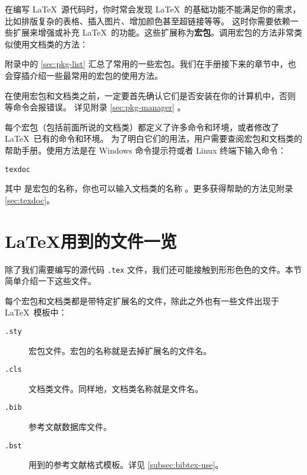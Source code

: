 在编写 \LaTeX\ 源代码时，你时常会发现 \LaTeX\ 的基础功能不能满足你的需求，比如排版复杂的表格、插入图片、增加颜色甚至超链接等等。
这时你需要依赖一些扩展来增强或补充 \LaTeX\ 的功能。这些扩展称为\textbf{宏包}。调用宏包的方法非常类似使用文档类的方法：
\begin{command}
\end{command}

附录中的 \ref{sec:pkg-list} 汇总了常用的一些宏包。我们在手册接下来的章节中，也会穿插介绍一些最常用的宏包的使用方法。

在使用宏包和文档类之前，一定要首先确认它们是否安装在你的计算机中，否则  等命令会报错误。
详见附录 \ref{sec:pkg-manager} 。

每个宏包（包括前面所说的文档类）都定义了许多命令和环境，或者修改了 \LaTeX\ 已有的命令和环境。
为了明白它们的用法，用户需要查阅宏包和文档类的帮助手册。使用方法是在 Windows 命令提示符或者 Linux 终端下输入命令：
\begin{command}
\texttt{texdoc} 
\end{command}

其中  是宏包的名称，你也可以输入文档类的名称 。更多获得帮助的方法见附录 \ref{sec:texdoc}。

\section{\LaTeX 用到的文件一览}\label{sec:latex-files}

除了我们需要编写的源代码 \texttt{.tex} 文件，我们还可能接触到形形色色的文件。本节简单介绍一下这些文件。

每个宏包和文档类都是带特定扩展名的文件，除此之外也有一些文件出现于 \LaTeX\ 模板中：
\begin{description}
  \item[\texttt{.sty}] 宏包文件。宏包的名称就是去掉扩展名的文件名。
  \item[\texttt{.cls}] 文档类文件。同样地，文档类名称就是文件名。
  \item[\texttt{.bib}]  参考文献数据库文件。
  \item[\texttt{.bst}]  用到的参考文献格式模板。详见 \ref{subsec:bibtex-use}。
\end{description}

